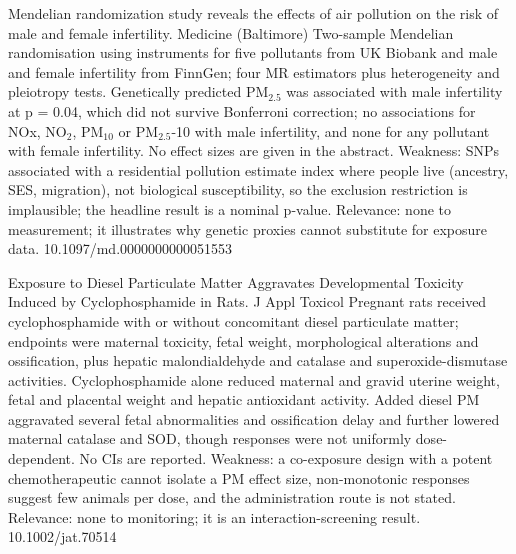 \documentclass[10pt]{article}
\begin{document}
{Mendelian randomization study reveals the effects of air pollution on the risk of male and female infertility.}
{Medicine (Baltimore)}
{Two-sample Mendelian randomisation using instruments for five pollutants from UK Biobank and male and female infertility from FinnGen; four MR estimators plus heterogeneity and pleiotropy tests. Genetically predicted PM$_{2.5}$ was associated with male infertility at p = 0.04, which did not survive Bonferroni correction; no associations for NOx, NO$_2$, PM$_{10}$ or PM$_{2.5}$-10 with male infertility, and none for any pollutant with female infertility. No effect sizes are given in the abstract. Weakness: SNPs associated with a residential pollution estimate index where people live (ancestry, SES, migration), not biological susceptibility, so the exclusion restriction is implausible; the headline result is a nominal p-value. Relevance: none to measurement; it illustrates why genetic proxies cannot substitute for exposure data.}
{10.1097/md.0000000000051553}

{Exposure to Diesel Particulate Matter Aggravates Developmental Toxicity Induced by Cyclophosphamide in Rats.}
{J Appl Toxicol}
{Pregnant rats received cyclophosphamide with or without concomitant diesel particulate matter; endpoints were maternal toxicity, fetal weight, morphological alterations and ossification, plus hepatic malondialdehyde and catalase and superoxide-dismutase activities. Cyclophosphamide alone reduced maternal and gravid uterine weight, fetal and placental weight and hepatic antioxidant activity. Added diesel PM aggravated several fetal abnormalities and ossification delay and further lowered maternal catalase and SOD, though responses were not uniformly dose-dependent. No CIs are reported. Weakness: a co-exposure design with a potent chemotherapeutic cannot isolate a PM effect size, non-monotonic responses suggest few animals per dose, and the administration route is not stated. Relevance: none to monitoring; it is an interaction-screening result.}
{10.1002/jat.70514}

\par{}\baselineskip{}\baselineskip
{}
\end{document}
